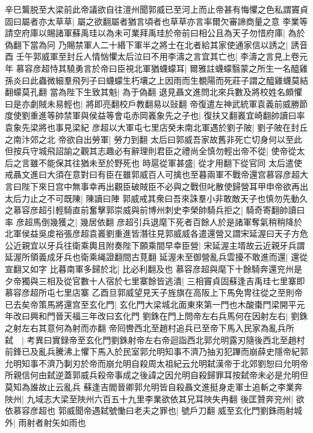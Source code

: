 辛巳鸗脱至大梁前此帝議欲自往澶州聞郭威已至河上而止帝甚有悔懼之色私謂竇貞固曰屬者亦太草草|{
	屬之欲翻屬者猶言頃者也草草亦言率爾欠審諦商量之意}
李業等請空府庫以賜諸軍蘇禹珪以為未可業拜禹珪於帝前曰相公且為天子勿惜府庫|{
	為於偽翻下當為冋}
乃賜禁軍人二十緡下軍半之將士在北者給其家使通家信以誘之|{
	誘音酉}
壬午郭威軍至封丘人情忷懼太后泣曰不用李濤之言宜其亡也|{
	李濤之言見上卷元年}
慕容彦超恃其驍勇言於帝曰臣視北軍猶蠛蠓耳|{
	爾雅註蠛蠓翳蒙之所生一名醯雞孫炎曰此蟲微細羣飛列子曰蠛蠓生朽壤之上因雨而生覩陽而死莊子謂之醯雞蠛莫結翻蠓莫孔翻}
當為陛下生致其魁|{
	為于偽翻}
退見聶文進問北來兵數及將校姓名頗懼曰是亦劇賊未易輕也|{
	將即亮翻校戶教翻易以䜴翻}
帝復遣左神武統軍袁義前威勝節度使劉重進等帥禁軍與侯益等會屯赤岡㠖象先之子也|{
	復扶又翻㠖宜崎翻帥讀曰率袁象先梁將也事見梁紀}
彦超以大軍屯七里店癸未南北軍遇於劉子陂|{
	劉子陂在封丘之南汴郊之北}
帝欲自出勞軍|{
	勞力到翻}
太后曰郭威吾家故舊非死亡切身何以至此但按兵守城飛詔諭之觀其志趣必有辭理則君臣之禮尚全慎勿輕出帝不從|{
	使帝從太后之言雖不能保其往猶未至於野死也}
時扈從軍甚盛|{
	從才用翻下從官同}
太后遣使戒聶文進曰大須在意對曰有臣在雖郭威百人可擒也至暮兩軍不戰帝還宫慕容彦超大言曰陛下來日宫中無事幸再出觀臣破賊臣不必與之戰但叱散使歸營耳甲申帝欲再出太后力止之不可既陳|{
	陳讀曰陣}
郭威戒其衆曰吾來誅羣小非敢敵天子也慎勿先動久之慕容彦超引輕騎直前奮擊郭崇威與前博州刺史李榮帥騎兵拒之|{
	騎奇寄翻帥讀曰率}
彦超馬倒幾獲之|{
	幾居依翻}
彦超引兵退麾下死者百餘人於是諸軍奪氣稍稍降於北軍侯益吳䖍裕張彦超袁㠖劉重進皆潛往見郭威威各遣還營又謂宋延渥曰天子方危公近親宜以牙兵往衛乘輿且附奏陛下願乘間早幸臣營|{
	宋延渥主壻故云近親牙兵謂延渥所領義成牙兵也衛乘䋲證翻間古莧翻}
延渥未至御營亂兵雲擾不敢進而還|{
	還從宣翻又如字}
比暮南軍多歸於北|{
	比必利翻及也}
慕容彦超與麾下十餘騎奔還兖州是夕帝獨與三相及從官數十人宿於七里寨餘皆逃潰|{
	三相竇貞固蘇逢吉禹珪七里寨即慕容彦超所屯七里店寨}
乙酉旦郭威望見天子旌旗在高阪上下馬免冑往從之至則帝已去矣帝策馬將還宫至玄化門|{
	玄化門大梁城北面東來第一門也木酸棗門梁開平元年改曰興和門晉天福三年改曰玄化門}
劉銖在門上問帝左右兵馬何在因射左右|{
	劉銖之射左右其意何為射而亦翻}
帝囘轡西北至趙村追兵已至帝下馬入民家為亂兵所弑　|{
	考異曰實録帝至玄化門劉銖射帝左右帝迴詣西北郭允明露刃隨後西北至趙村前鋒已及亂兵騰沸上懼下馬入於民室郭允明知事不濟乃抽刃犯蹕而崩薛史隱帝紀郭允明知事不濟乃剚刃於帝而崩允明自殺周太祖紀云允明弑漢帝于北郊劉恕曰允明帝所親信何由弑逆蓋郭威兵殺帝事成之後諱之因允明自殺歸罪耳按弑帝未必是允明但莫知為誰故止云亂兵}
蘇逢吉閻晉卿郭允明皆自殺聶文進挺身走軍士追斬之李業奔陜州|{
	九域志大梁至陜州六百五十九里李業欲依其兄耳陜失冉翻}
後匡贊奔兖州|{
	欲依慕容彦超也}
郭威聞帝遇弑號慟曰老夫之罪也|{
	號戶刀翻}
威至玄化門劉銖雨射城外|{
	雨射者射矢如雨也}
